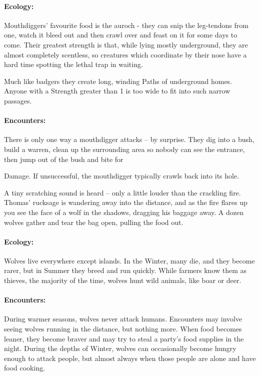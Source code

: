 \paragraph{Ecology:} Mouthdiggers' favourite food is the auroch - they can snip the leg-tendons from one, watch it bleed out and then crawl over and feast on it for some days to come.  Their greatest strength is that, while lying mostly underground, they are almost completely scentless, so creatures which coordinate by their nose have a hard time spotting the lethal trap in waiting.

Much like badgers they create long, winding Paths of underground homes.  Anyone with a Strength greater than 1 is too wide to fit into such narrow passages.

\paragraph{Encounters:} There is only one way a mouthdigger attacks -- by surprise.  They dig into a bush, build a warren, clean up the surrounding area so nobody can see the entrance, then jump out of the bush and bite for \addtocounter{strb}{-5} Damage.  If unsuccessful, the mouthdigger typically crawls back into its hole.

\label{wolf}
\wolf

\begin{boxtext}

	A tiny scratching sound is heard -- only a little louder than the crackling fire.  Thomas' rucksage is wandering away into the distance, and as the fire flares up you see the face of a wolf in the shadows, dragging his baggage away.  A dozen wolves gather and tear the bag open, pulling the food out.

\end{boxtext}

\paragraph{Ecology:} Wolves live everywhere except islands.  In the Winter, many die, and they become rarer, but in Summer they breed and run quickly.  While farmers know them as thieves, the majority of the time, wolves hunt wild animals, like boar or deer.

\paragraph{Encounters:} During warmer seasons, wolves never attack humans.  Encounters may involve seeing wolves running in the distance, but nothing more.  When food becomes leaner, they become braver and may try to steal a party's food supplies in the night.  During the depths of Winter, wolves can occasionally become hungry enough to attack people, but almost always when those people are alone and have food cooking.

